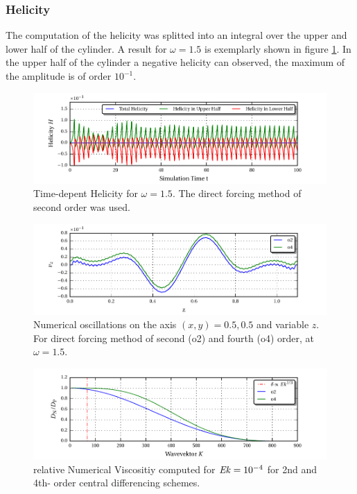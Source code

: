 \subsubsection{Helicity}

The computation of the helicity was splitted into an integral over the upper and lower half
of the cylinder.  A result for $\omega=1.5$ is exemplarly shown in figure \ref{cone:cyl_helicity}.
In the upper half of the cylinder a negative helicity can observed, the maximum of the amplitude is of order $10^{-1}$.


\clearpage
\begin{figure}[!t]
  \centering
  \includegraphics{gfx/cone/cylinder/helicity.pdf}  \caption{
      Time-depent Helicity for $\omega=1.5$. The direct forcing method of second order was used.
      \label{cone:cyl_helicity}
      }
\end{figure}
\begin{figure}[!p]
  \centering
  \includegraphics{gfx/cone/cylinder/oscillations.pdf}  \caption{
      Numerical oscillations on the axis $(x,y) = 0.5, 0.5$ and variable $z$.
      For direct forcing method of second (o2) and fourth (o4) order, at $\omega=1.5$.
      \label{cone:cyl_oscillations}
      }
\end{figure}
\begin{figure}[!b]
  \centering
  \includegraphics{gfx/cone/cylinder/numvis.pdf}  \caption{
      relative Numerical Viscositiy computed for $\mbox{\textit{Ek}}=10^{-4}$ for 2nd and 4th- order central differencing schemes.
      \label{cone:cyl_numvis}
      }
\end{figure}
\clearpage

